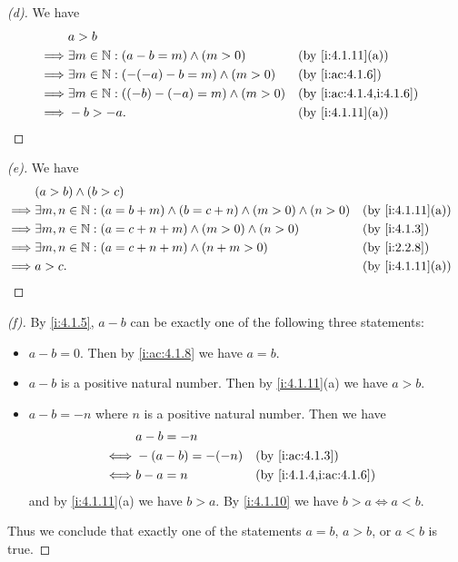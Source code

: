 \begin{proof}[(d)]
  We have
  \begin{align*}
             & a > b                                                                           \\
    \implies & \exists m \in \N : (a - b = m) \land (m > 0)       &  & \by{i:4.1.11}[a]        \\
    \implies & \exists m \in \N : (-(-a) - b = m) \land (m > 0)   &  & \by{i:ac:4.1.6}         \\
    \implies & \exists m \in \N : ((-b) - (-a) = m) \land (m > 0) &  & \by{i:ac:4.1.4,i:4.1.6} \\
    \implies & -b > -a.                                           &  & \by{i:4.1.11}[a]
  \end{align*}
\end{proof}

\begin{proof}[(e)]
  We have
  \begin{align*}
             & (a > b) \land (b > c)                                                                                 \\
    \implies & \exists m, n \in \N : (a = b + m) \land (b = c + n) \land (m > 0) \land (n > 0) &  & \by{i:4.1.11}[a] \\
    \implies & \exists m, n \in \N : (a = c + n + m) \land (m > 0) \land (n > 0)               &  & \by{i:4.1.3}     \\
    \implies & \exists m, n \in \N : (a = c + n + m) \land (n + m > 0)                         &  & \by{i:2.2.8}     \\
    \implies & a > c.                                                                          &  & \by{i:4.1.11}[a]
  \end{align*}
\end{proof}

\begin{proof}[(f)]
  By \cref{i:4.1.5}, \(a - b\) can be exactly one of the following three statements:
  \begin{itemize}
    \item \(a - b = 0\).
          Then by \cref{i:ac:4.1.8} we have \(a = b\).
    \item \(a - b\) is a positive natural number.
          Then by \cref{i:4.1.11}(a) we have \(a > b\).
    \item \(a - b = -n\) where \(n\) is a positive natural number.
          Then we have
          \begin{align*}
                 & a - b = -n                                    \\
            \iff & -(a - b) = -(-n) &  & \by{i:ac:4.1.3}         \\
            \iff & b - a = n        &  & \by{i:4.1.4,i:ac:4.1.6}
          \end{align*}
          and by \cref{i:4.1.11}(a) we have \(b > a\).
          By \cref{i:4.1.10} we have \(b > a \iff a < b\).
  \end{itemize}
  Thus we conclude that exactly one of the statements \(a = b\), \(a > b\), or \(a < b\) is true.
\end{proof}

